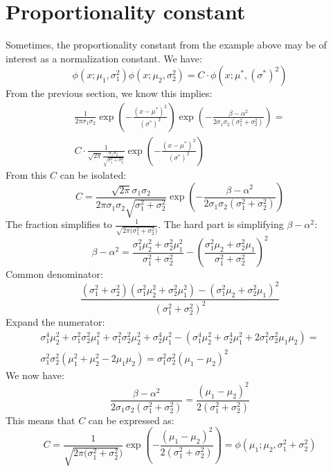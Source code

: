 \documentclass[12pt, a4paper]{article}
\begin{document}
\section{Proportionality constant}
Sometimes, the proportionality constant from the example above may be of interest as a normalization constant. We have:
\begin{equation}
\phi(x;\mu_1,\sigma_1^2)\phi(x;\mu_2,\sigma_2^2)=C\cdot\phi\left(x;\mu^*,(\sigma^*)^2\right)
\end{equation}
From the previous section, we know this implies:
\begin{align}
\frac{1}{2\pi\sigma_1\sigma_2}\exp\left(-\frac{(x-\mu^*)^2}{(\sigma^*)^2}\right)\exp\left(-\frac{\beta-\alpha^2}{2\sigma_1\sigma_2(\sigma_1^2+\sigma_2^2)}\right)=\\
C\cdot\frac{1}{\sqrt{2\pi}\frac{\sigma_1\sigma_2}{\sqrt{\sigma_1^2+\sigma_2^2}}}\exp\left(-\frac{(x-\mu^*)^2}{(\sigma^*)^2}\right)
\end{align}
From this $C$ can be isolated:
\begin{equation}
C=\frac{\sqrt{2\pi}\sigma_1\sigma_2}{2\pi\sigma_1\sigma_2\sqrt{\sigma_1^2+\sigma_2^2}}\exp\left(-\frac{\beta-\alpha^2}{2\sigma_1\sigma_2(\sigma_1^2+\sigma_2^2)}\right)
\end{equation}
The fraction simplifies to $\frac{1}{\sqrt{2\pi(\sigma_1^2+\sigma_2^2})}$. The hard part is simplifying $\beta-\alpha^2$:
\begin{equation}
\beta-\alpha^2=\frac{\sigma_1^2\mu_2^2+\sigma_2^2\mu_1^2}{\sigma_1^2+\sigma_2^2}-\left(\frac{\sigma_1^2\mu_2+\sigma_2^2\mu_1}{\sigma_1^2+\sigma_2^2}\right)^2
\end{equation}
Common denominator:
\begin{equation}
\frac{(\sigma_1^2+\sigma_2^2)(\sigma_1^2\mu_2^2+\sigma_2^2\mu_1^2)-(\sigma_1^2\mu_2+\sigma_2^2\mu_1)^2}{(\sigma_1^2+\sigma_2^2)^2}
\end{equation}
Expand the numerator:
\begin{align}
\sigma_1^4\mu_2^2+\sigma_1^2\sigma_2^2\mu_1^2+\sigma_1^2\sigma_2^2\mu_2^2+\sigma_2^4\mu_1^2-(\sigma_1^4\mu_2^2+\sigma_2^4\mu_1^2+2\sigma_1^2\sigma_2^2\mu_1\mu_2)=\\
\sigma_1^2\sigma_2^2(\mu_1^2+\mu_2^2-2\mu_1\mu_2)=\sigma_1^2\sigma_2^2(\mu_1-\mu_2)^2
\end{align}
We now have:
\begin{equation}
\frac{\beta-\alpha^2}{2\sigma_1\sigma_2(\sigma_1^2+\sigma_2^2)}=\frac{(\mu_1-\mu_2)^2}{2(\sigma_1^2+\sigma_2^2)}
\end{equation}
This means that $C$ can be expressed as:
\begin{equation}
C=\frac{1}{\sqrt{2\pi(\sigma_1^2+\sigma_2^2})}\exp\left(-\frac{(\mu_1-\mu_2)^2}{2(\sigma_1^2+\sigma_2^2)}\right)=\phi(\mu_1;\mu_2,\sigma_1^2+\sigma_2^2)
\end{equation}
\end{document}
